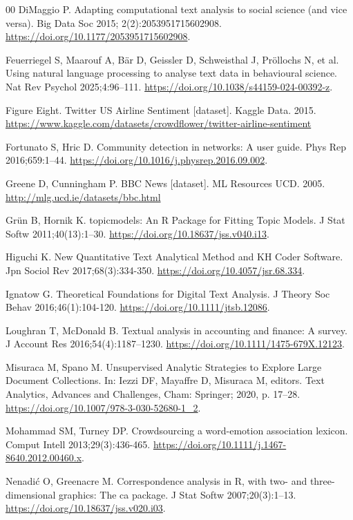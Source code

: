 \documentclass[preprint,12pt,a4paper]{elsarticle}
\begin{document}
\begin{thebibliography}{00}
 DiMaggio P. Adapting computational text analysis to social science (and vice versa). Big Data Soc 2015; 2(2):2053951715602908. \url{https://doi.org/10.1177/2053951715602908}.

 Feuerriegel S, Maarouf A, B{\"a}r D, Geissler D, Schweisthal J, Pr{\"o}llochs N, et al. Using natural language processing to analyse text data in behavioural science. Nat Rev Psychol 2025;4:96–111. \url{https://doi.org/10.1038/s44159-024-00392-z}.

 Figure Eight. Twitter US Airline Sentiment [dataset]. Kaggle Data. 2015. \url{https://www.kaggle.com/datasets/crowdflower/twitter-airline-sentiment}

 Fortunato S, Hric D. Community detection in networks: A user guide. Phys Rep 2016;659:1–44. \url{https://doi.org/10.1016/j.physrep.2016.09.002}.

 Greene D, Cunningham P. BBC News [dataset]. ML Resources UCD. 2005. \url{http://mlg.ucd.ie/datasets/bbc.html}

 Gr{\"u}n B, Hornik K. topicmodels: An R Package for Fitting Topic Models. J Stat Softw 2011;40(13):1–30. \url{https://doi.org/10.18637/jss.v040.i13}.

 Higuchi K. New Quantitative Text Analytical Method and KH Coder Software. Jpn Sociol Rev 2017;68(3):334-350. \url{https://doi.org/10.4057/jsr.68.334}.

 Ignatow G. Theoretical Foundations for Digital Text Analysis. J Theory Soc Behav 2016;46(1):104-120. \url{https://doi.org/10.1111/jtsb.12086}.

 Loughran T, McDonald B. Textual analysis in accounting and finance: A survey. J Account Res 2016;54(4):1187–1230. \url{https://doi.org/10.1111/1475-679X.12123}.

 Misuraca M, Spano M. Unsupervised Analytic Strategies to Explore Large Document Collections. In: Iezzi DF, Mayaffre D, Misuraca M, editors. Text Analytics, Advances and Challenges, Cham: Springer; 2020, p. 17–28. \url{https://doi.org/10.1007/978-3-030-52680-1_2}.

 Mohammad SM, Turney DP. Crowdsourcing a word-emotion association lexicon. Comput Intell 2013;29(3):436-465. \url{https://doi.org/10.1111/j.1467-8640.2012.00460.x}.

 Nenadić O, Greenacre M. Correspondence analysis in R, with two- and three-dimensional graphics: The ca package. J Stat Softw 2007;20(3):1–13. \url{https://doi.org/10.18637/jss.v020.i03}.


\end{thebibliography}
\end{document}
